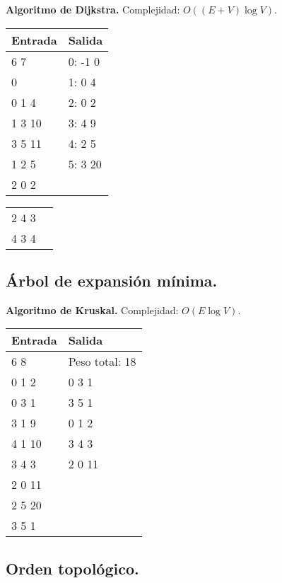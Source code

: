 \documentclass[10pt, letterpaper, twoside]{article}
\begin{document}
\textbf{Algoritmo de Dijkstra.} Complejidad: $O((E + V) \log V)$.



\begin{tabular}{|p{7cm}|p{7cm}|}
\hline
\textbf{Entrada} & \textbf{Salida} \\ \hline
6 7    & 0: -1 0 \\
0      & 1: 0 4  \\ 
0 1 4  & 2: 0 2  \\
1 3 10 & 3: 4 9  \\
3 5 11 & 4: 2 5  \\
1 2 5  & 5: 3 20 \\
2 0 2  & \\
\end{tabular}

\begin{tabular}{|p{7cm}|p{7cm}|}
2 4 3  & \\
4 3 4  & \\ \hline
\end{tabular}

\subsection{Árbol de expansión mínima.}

\textbf{Algoritmo de Kruskal.} Complejidad: $O(E \log V)$.



\begin{tabular}{|p{7cm}|p{7cm}|}
\hline
\textbf{Entrada} & \textbf{Salida} \\ \hline
6 8    & Peso total: 18 \\
0 1 2  & 0 3 1 \\
0 3 1  & 3 5 1 \\
3 1 9  & 0 1 2 \\
4 1 10 & 3 4 3 \\
3 4 3  & 2 0 11 \\
2 0 11 & \\
2 5 20 & \\
3 5 1  & \\ \hline
\end{tabular}

\subsection{Orden topológico.}
\end{document}
